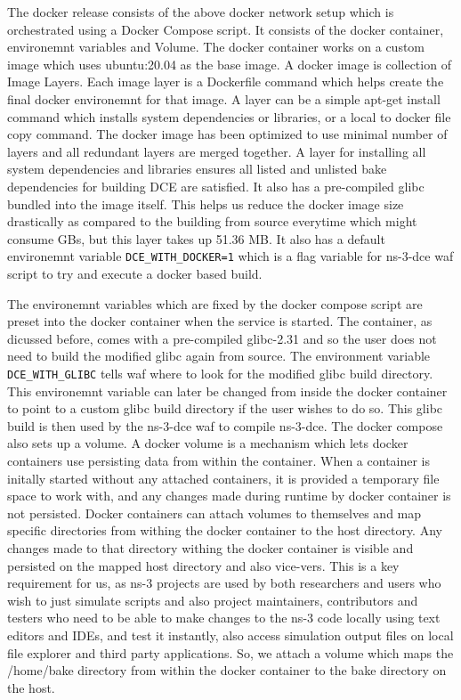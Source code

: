 \documentclass{sig-alternate}
\begin{document}
The docker release consists of the above docker network setup which is orchestrated using a Docker Compose script. 
It consists of the docker container, environemnt variables and Volume. The docker 
container works on a custom image which uses ubuntu:20.04 as the base image. A docker image is collection of Image Layers. Each image layer is a 
Dockerfile command which helps create the final docker environemnt for that image. A layer can be a simple apt-get install command which installs 
system dependencies or libraries, or a local to docker file copy command. The docker image has been optimized to use minimal number of layers and 
all redundant layers are merged together. A layer for installing all system dependencies and libraries ensures all listed and unlisted bake 
dependencies for building DCE are satisfied. It also has a pre-compiled glibc bundled into the image itself. This helps us reduce the docker 
image size drastically as compared to the building from source everytime which might consume GBs, but this layer takes up 51.36 MB.
It also has a default environemnt variable 
\texttt{DCE\_WITH\_DOCKER=1} which is a flag variable for ns-3-dce waf script to try and execute a docker based build.

The environemnt variables which are fixed by the docker compose script are preset into the docker container when the service is started.
The container, as dicussed before, comes with a pre-compiled glibc-2.31 and so the user does not need to build the modified glibc again from source.
The environment variable \texttt{DCE\_WITH\_GLIBC} tells waf where to look for the modified glibc build directory. This environemnt variable can 
later be changed from inside the docker container to point to a custom glibc build directory if the user wishes to do so. This glibc build is then 
used by the ns-3-dce waf to compile ns-3-dce. The docker compose also sets up a volume. A docker volume is a mechanism which lets docker containers 
use persisting data from within the container. When a container is initally started without any attached containers, it is provided a temporary 
file space to work with, and any changes made during runtime by docker container is not persisted. Docker containers can attach volumes to themselves
and map specific directories from withing the docker container to the host directory. Any changes made to that directory withing the  docker container
is visible and persisted on the mapped host directory and also vice-vers. This is a key requirement for us, as ns-3 projects are used by both 
researchers and users who wish to just simulate scripts and also project maintainers, contributors and testers who need to be able to make changes 
to the ns-3 code locally using text editors and IDEs, and test it instantly, also access simulation output files on local file explorer and 
third party applications. So, we attach a volume which maps the /home/bake directory from within the docker container to the bake directory on 
the host.
\end{document}

